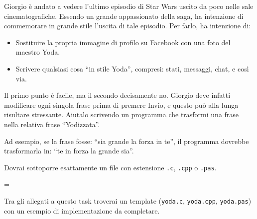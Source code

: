 \usepackage{xcolor}
\usepackage{afterpage}
\usepackage{pifont,mdframed}
\usepackage[bottom]{footmisc}

\makeatletter
\gdef\this@inputfilename{input.txt}
\gdef\this@outputfilename{output.txt}
\makeatother

\newcommand{\inputfile}{\texttt{input.txt}}
\newcommand{\outputfile}{\texttt{output.txt}}

\newenvironment{warning}
  {\par\begin{mdframed}[linewidth=2pt,linecolor=gray]%
    \begin{list}{}{\leftmargin=1cm
                   \labelwidth=\leftmargin}\item[\Large\ding{43}]}
  {\end{list}\end{mdframed}\par}

Giorgio è andato a vedere l'ultimo episodio di Star Wars uscito da poco nelle sale cinematografiche. Essendo un grande appassionato della saga, ha intenzione di commemorare in grande stile l'uscita di tale episodio. Per farlo, ha intenzione di:

\begin{itemize}
  \item Sostituire la propria immagine di profilo su Facebook con una foto del maestro Yoda.
  \item Scrivere qualsiasi cosa ``in stile Yoda'', compresi: stati, messaggi, chat, e così via.
\end{itemize}

Il primo punto è facile, ma il secondo decisamente no. Giorgio deve infatti modificare ogni singola frase prima di premere Invio, e questo può alla lunga risultare stressante. Aiutalo scrivendo un programma che trasformi una frase nella relativa frase ``Yodizzata''.

Ad esempio, se la frase fosse: ``sia grande la forza in te'', il programma dovrebbe trasformarla in: ``te in forza la grande sia''.

\Implementation
Dovrai sottoporre esattamente un file con estensione \texttt{.c}, \texttt{.cpp} o \texttt{.pas}.

\begin{warning}
Tra gli allegati a questo task troverai un template (\texttt{yoda.c}, \texttt{yoda.cpp}, \texttt{yoda.pas}) con un esempio di implementazione da completare.
\end{warning}

